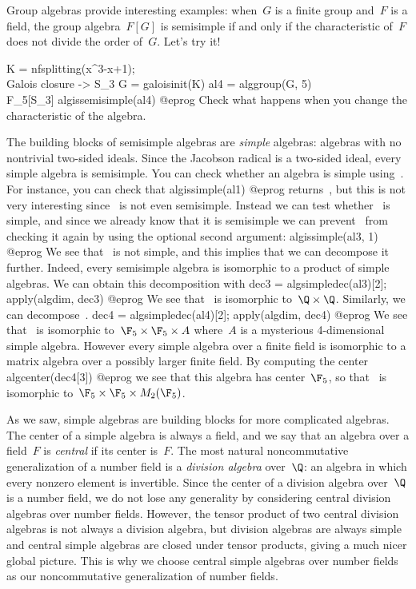 Group algebras provide interesting examples: when~$G$ is a finite group and~$F$
is a field, the group algebra~$F[G]$ is semisimple if and only if the
characteristic of~$F$ does not divide the order of~$G$. Let's try it!

\bprog
K = nfsplitting(x^3-x+1); \\ Galois closure -> S_3
G = galoisinit(K)
al4 = alggroup(G, 5) \\ F_5[S_3]
algissemisimple(al4)
@eprog\noindent
Check what happens when you change the characteristic of the algebra.

The building blocks of semisimple algebras are \emph{simple} algebras:
algebras with no nontrivial two-sided ideals. Since the Jacobson radical is a
two-sided ideal, every simple algebra is semisimple. You can check whether an
algebra is simple using~. For instance, you can check that
\bprog
algissimple(al1)
@eprog\noindent
returns~, but this is not very interesting since~ is not even
semisimple. Instead we can test whether~ is simple, and since we
already know that it is semisimple we can prevent~ from checking it
again by using the optional second argument:
\bprog
algissimple(al3, 1)
@eprog\noindent
We see that~ is not simple, and this implies that we can decompose it
further. Indeed, every semisimple algebra is isomorphic to a product of simple algebras.
We can obtain this decomposition with
\bprog
dec3 = algsimpledec(al3)[2];
apply(algdim, dec3)
@eprog\noindent
We see that~ is isomorphic to~$\Q\times\Q$. Similarly, we can
decompose~.
\bprog
dec4 = algsimpledec(al4)[2];
apply(algdim, dec4)
@eprog\noindent
We see that~ is isomorphic to~$\F_5\times\F_5\times A$ where~$A$ is a
mysterious 4-dimensional simple algebra. However every simple algebra over a
finite field is isomorphic to a matrix algebra over a possibly larger finite
field. By computing the center
\bprog
algcenter(dec4[3])
@eprog\noindent
we see that this algebra has center~$\F_5$, so that~ is isomorphic
to~$\F_5\times\F_5\times M_2(\F_5)$.


As we saw, simple algebras are building blocks for more complicated algebras.
The center of a simple algebra is always a field, and we say that an
algebra over a field~$F$ is \emph{central} if its center is~$F$. The most
natural noncommutative generalization of a number field is a \emph{division
algebra} over~$\Q$: an algebra in which every nonzero element is invertible.
Since the center of a division algebra over~$\Q$ is a number field, we do not
lose any generality by considering central division algebras over number
fields. However, the tensor product of two central division algebras is not
always a division algebra, but division algebras are always simple and central
simple algebras are closed under tensor products, giving a much nicer global
picture. This is why we choose central simple algebras over number fields as our
noncommutative generalization of number fields.

